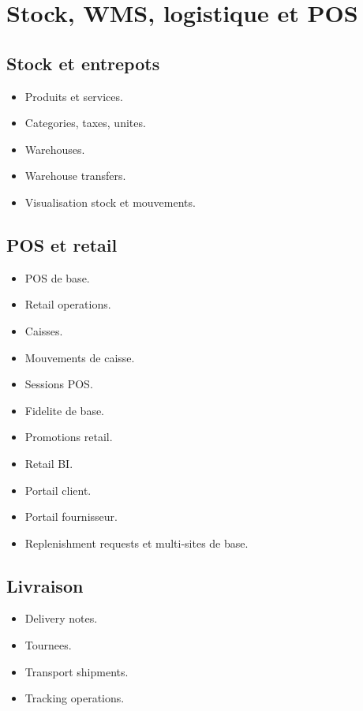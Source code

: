\documentclass[11pt,a4paper]{article}
\begin{document}
\section{Stock, WMS, logistique et POS}
\subsection{Stock et entrepots}
\begin{itemize}[leftmargin=1.2cm]
    \item Produits et services.
    \item Categories, taxes, unites.
    \item Warehouses.
    \item Warehouse transfers.
    \item Visualisation stock et mouvements.
\end{itemize}

\subsection{POS et retail}
\begin{itemize}[leftmargin=1.2cm]
    \item POS de base.
    \item Retail operations.
    \item Caisses.
    \item Mouvements de caisse.
    \item Sessions POS.
    \item Fidelite de base.
    \item Promotions retail.
    \item Retail BI.
    \item Portail client.
    \item Portail fournisseur.
    \item Replenishment requests et multi-sites de base.
\end{itemize}

\subsection{Livraison}
\begin{itemize}[leftmargin=1.2cm]
    \item Delivery notes.
    \item Tournees.
    \item Transport shipments.
    \item Tracking operations.
\end{itemize}
\end{document}

